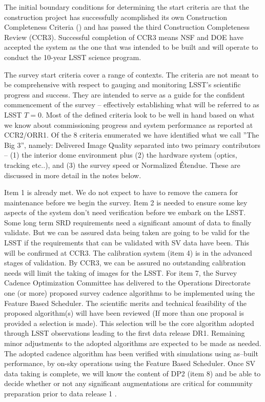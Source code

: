The initial boundary conditions for determining the start criteria are that the construction project has successfully acomplished its own Construction Completeness Criteria (\cite{SITCOMTN-005}) and has passed the third Construction Completeness Review (CCR3).  Successful completion of CCR3 means NSF and DOE have accepted the system as the one that was intended to be built and will operate to conduct the 10-year LSST science program.  

The survey start criteria cover a range of contexts.  The criteria are not meant to be comprehensive with respect to gauging and monitoring LSST's scientific progress and success. They are intended to serve as a guide for the confident commencement of the survey -- effectively establishing what will be referred to as LSST $T=0$.  Most of the defined criteria look to be well in hand based on what we know about commissioning progress and system performance as reported at CCR2/ORR1.  Of the 8 criteria enumerated we have identified what we call ''The Big 3'', namely: Delivered Image Quality separated into two primary contributors -- (1) the interior dome environment plus (2) the hardware system (optics, tracking etc..), and (3) the survey speed or Normalized \'{E}tendue. These are discussed in more detail in the notes below.

Item 1 is already met. We do not expect to have to remove the camera for maintenance before we begin the survey. Item 2 is needed to ensure some key aspects of the system don't need verification before we embark on the LSST. Some long term SRD requirements need a significant amount of data to finally validate. But we can be assured data being taken are going to be valid for the LSST if the requirements that can be validated with SV data have been. This will be confirmed at CCR3. The calibration system (item 4)  is in the advanced stages of validation. By CCR3, we can be assured no outstanding calibration needs will limit the taking of images for the LSST. For item 7, the Survey Cadence Optimization Committee has delivered to the Operations Directorate one (or more) proposed survey cadence algorithms to be implemented using the Feature Based Scheduler.  The scientific merits and technical feasibility of the proposed algorithm(s) will have been reviewed (If more than one proposal is provided a selection is made).  This selection will be the core algorithm adopted through LSST observations leading to the first data release DR1.  Remaining minor adjustments to the adopted algorithms are expected to be made as needed.  The adopted cadence algorithm has been verified with simulations using as--built performance, by on-sky operations using the Feature Based Scheduler.  Once SV data taking is complete, we will know the content of DP2 (item 8) and be able to decide whether or not any significant augmentations are critical for community preparation prior to data release 1 \citep[DR1; see][]{RTN-011}. 

